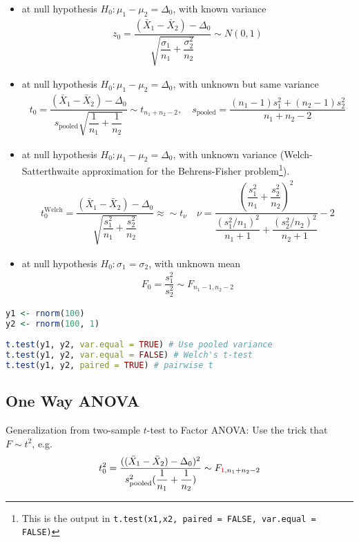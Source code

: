 \begin{itemize}[topsep=2pt,itemsep=0pt]
    \item at null hypothesis $ H_0: \mu _1-\mu _2 = \Delta_0 $, with known variance
    \begin{align}
         z_0=\dfrac{ (\bar{X}_1-\bar{X}_2)-\Delta _0 }{ \sqrt{\dfrac{ \sigma _1 }{ n_1 }+\dfrac{ \sigma _2^2 }{ n_2 }  } } \sim N(0,1) 
    \end{align}
    \item at null hypothesis $ H_0: \mu _1-\mu _2 = \Delta_0 $, with unknown but same variance
    \begin{align}
        t_0 = \dfrac{ (\bar{X}_1-\bar{X}_2)-\Delta _0 }{ s_\mathrm{ pooled }\sqrt{\dfrac{ 1 }{ n_1 } + \dfrac{ 1 }{ n_2 }  }  }\sim t_{n_1+n_2-2},\quad s_\mathrm{ pooled }=\dfrac{ (n_1-1)s_1^2+(n_2-1)s_2^2 }{ n_1+n_2-2 }  
    \end{align}
    \item at null hypothesis $ H_0: \mu _1-\mu _2 = \Delta_0 $, with unknown variance (Welch-Satterthwaite approximation for the  Behrens-Fisher problem\footnote{This is the output in \lstinline|t.test(x1,x2, paired = FALSE, var.equal = FALSE)|}).
    \begin{align}
         t_0^\text{Welch}=\dfrac{ (\bar{X}_1-\bar{X}_2)-\Delta _0 }{ \sqrt{\dfrac{ s_1^2 }{ n_1 }+\dfrac{ s_2^2 }{ n_2 }  } }\approx \sim t_\nu\quad \nu = \dfrac{ \left(\dfrac{ s_1^2 }{ n_1 }+\dfrac{ s_2^2 }{ n_2 }\right)^2 }{ \dfrac{ (s_1^2/n_1)^2 }{ n_1+1 }+\dfrac{ (s_2^2/n_2)^2 }{ n_2+1 }   }-2  
    \end{align}
    \item at null hypothesis $ H_0: \sigma _1=\sigma _2 $, with unknown mean
    \begin{align}
        F_0=\dfrac{ s_1^2 }{ s_2^2 }\sim F_{n_1-1,n_2-2}  
    \end{align}
\end{itemize}

\begin{rcode}
\begin{lstlisting}[language=R]
y1 <- rnorm(100)
y2 <- rnorm(100, 1)
    
t.test(y1, y2, var.equal = TRUE) # Use pooled variance
t.test(y1, y2, var.equal = FALSE) # Welch's t-test
t.test(y1, y2, paired = TRUE) # pairwise t
\end{lstlisting}
\end{rcode}

\subsection{One Way ANOVA}\label{SubSubSectionDoEOneWayANOVA}
Generalization from two-sample $ t $-test to Factor ANOVA: Use the trick that $ F\sim t^2 $, e.g. 
\begin{align}
    t_0^2 =\dfrac{( (\bar{X}_1-\bar{X}_2)-\Delta _0)^2 }{ s^2_\mathrm{ pooled }(\dfrac{ 1 }{ n_1 } + \dfrac{ 1 }{ n_2 }  )}\sim F_{{\color{red}1},n_1+n_2-2}
\end{align}


